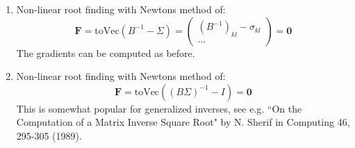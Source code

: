 \documentclass[11pt]{article}
\begin{document}
\begin{enumerate}

\item Non-linear root finding with Newtons method of:
\begin{equation}
\boldsymbol{F} 
= \text{toVec}(B^{-1} - \Sigma)
= \begin{pmatrix}
	(B^{-1})_{kl} - \sigma_{kl} \\
	\dots
\end{pmatrix}
= \boldsymbol{0}
\end{equation}
The gradients can be computed as before.

\item Non-linear root finding with Newtons method of:
\begin{equation}
\boldsymbol{F} 
= \text{toVec}((B \Sigma)^{-1} - I)
= \boldsymbol{0}
\end{equation}
This is somewhat popular for generalized inverses, see e.g. ``On the Computation of a Matrix Inverse Square Root" by N. Sherif in Computing 46, 295-305 (1989).

\end{enumerate}
\end{document}
